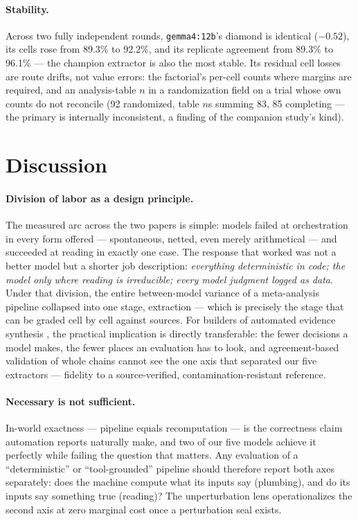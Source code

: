 \documentclass[11pt]{article}
\begin{document}
\paragraph{Stability.} Across two fully independent rounds, \texttt{gemma4:12b}'s diamond is identical ($-0.52$), its cells rose from 89.3\% to 92.2\%, and its replicate agreement from 89.3\% to 96.1\% --- the champion extractor is also the most stable. Its residual cell losses are route drifts, not value errors: the factorial's per-cell counts where margins are required, and an analysis-table $n$ in a randomization field on a trial whose own counts do not reconcile (92 randomized, table $n$s summing 83, 85 completing --- the primary is internally inconsistent, a finding of the companion study's kind).

\section{Discussion}

\paragraph{Division of labor as a design principle.} The measured arc across the two papers is simple: models failed at orchestration in every form offered --- spontaneous, netted, even merely arithmetical --- and succeeded at reading in exactly one case. The response that worked was not a better model but a shorter job description: \emph{everything deterministic in code; the model only where reading is irreducible; every model judgment logged as data}. Under that division, the entire between-model variance of a meta-analysis pipeline collapsed into one stage, extraction --- which is precisely the stage that can be graded cell by cell against sources. For builders of automated evidence synthesis \citep{bakker2026minutes,mclaughlin2026fully}, the practical implication is directly transferable: the fewer decisions a model makes, the fewer places an evaluation has to look, and agreement-based validation of whole chains \citep{lee2026noninferiority} cannot see the one axis that separated our five extractors --- fidelity to a source-verified, contamination-resistant reference.

\paragraph{Necessary is not sufficient.} In-world exactness --- pipeline equals recomputation --- is the correctness claim automation reports naturally make, and two of our five models achieve it perfectly while failing the question that matters. Any evaluation of a ``deterministic'' or ``tool-grounded'' pipeline should therefore report both axes separately: does the machine compute what its inputs say (plumbing), and do its inputs say something true (reading)? The unperturbation lens operationalizes the second axis at zero marginal cost once a perturbation seal exists.
\end{document}
